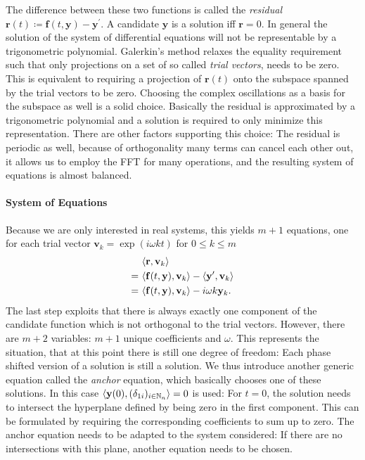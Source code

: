 The difference between these two functions is called the \emph{residual} $\mathbf{r}(t) \coloneqq \mathbf{f}(t,\mathbf{y}) - \mathbf{y}^\prime$.
A candidate $\mathbf y$ is a solution iff $\mathbf r = 0$.
In general the solution of the system of differential equations will not be representable by a trigonometric polynomial.
Galerkin's method relaxes the equality requirement such that only projections on a set of so called \emph{trial vectors}, needs to be zero.
This is equivalent to requiring a projection of $\mathbf{r}(t)$ onto the subspace spanned by the trial vectors to be zero.
Choosing the complex oscillations as a basis for the subspace as well is a solid choice.
Basically the residual is approximated by a trigonometric polynomial and a solution is required to only minimize this representation.
There are other factors supporting this choice: The residual is periodic as well, because of orthogonality many terms can cancel each other out, it allows us to employ the FFT for many operations, and the resulting system of equations is almost balanced.


\paragraph{System of Equations} Because we are only interested in real systems, this yields $m+1$ equations, one for each trial vector $\mathbf{v}_k = \exp\left( i \omega k t \right)$ for $0 \le k \le m$
	\begin{align*}
		& \langle \mathbf{r} , \mathbf{v}_k \rangle \\
		=\ & \langle \mathbf{f}(t,\mathbf{y}), \mathbf{v}_k \rangle - \langle \mathbf{y}^\prime, \mathbf{v}_k \rangle \\
		=\ & \langle \mathbf{f}(t,\mathbf{y}), \mathbf{v}_k \rangle - i \omega k \mathbf{y}_k \text.
	\end{align*}
The last step exploits that there is always exactly one component of the candidate function which is not orthogonal to the trial vectors.
However, there are $m+2$ variables: $m+1$ unique coefficients and $\omega$.
This represents the situation, that at this point there is still one degree of freedom: Each phase shifted version of a solution is still a solution.
We thus introduce another generic equation called the \emph{anchor} equation, which basically chooses one of these solutions.
In this case $\langle \mathbf{y}(0), (\delta_{1i})_{i \in \mathbb{N}_n} \rangle = 0$ is used:
For $t = 0$, the solution needs to intersect the hyperplane defined by being zero in the first component.
This can be formulated by requiring the corresponding coefficients to sum up to zero.
The anchor equation needs to be adapted to the system considered: If there are no intersections with this plane, another equation needs to be chosen.

